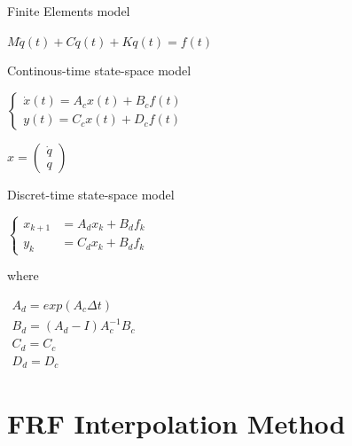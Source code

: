 \documentclass{beamer}
\begin{document}
\begin{frame}{Finite Elements model}

\begin{center}
$M \ddot{q}(t) + C \dot{q}(t) + K q(t) = f(t)$
\end{center}

\end{frame}


\begin{frame}{Continous-time state-space model}

\begin{center}
$\left\{
\begin{array}{ll}
\dot{x}(t) = A_cx(t) + B_cf(t) \\
y(t) = C_cx(t) + D_cf(t)
\end{array}
\right.$
\end{center}

$x =
\begin{pmatrix}
\dot{q} \\
q
\end{pmatrix}$

\end{frame}


\begin{frame}{Discret-time state-space model}

\begin{center}
$\left\{
\begin{array}{ll}
x_{k+1} & = A_dx_k + B_df_k \\
y_k & = C_dx_k + B_df_k
\end{array}
\right.$

\vspace{5mm}

where

\vspace{5mm}

$\begin{array}{ll}
A_d = exp(A_c \Delta t) \\
B_d= (A_d - I) A^{-1}_c B_c \\
C_d = C_c \\
D_d = D_c
\end{array}$

\end{center}


\end{frame}

\section{FRF Interpolation Method}
\end{document}
